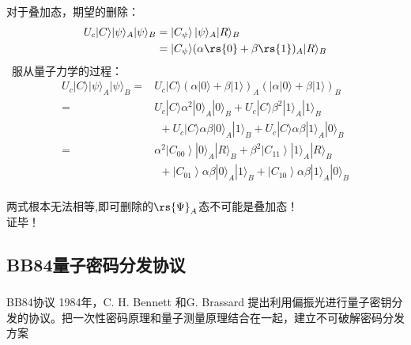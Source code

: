 \begin{frame}
    \frametitle{}
    对于叠加态，期望的删除：
    \[\begin{aligned}
        U_{c}|C\rangle|\psi\rangle_{A}|\psi\rangle_{B}&=\left|C_{\psi}\right\rangle|\psi\rangle_{A}|R\rangle_{B} \\
        &=|C_{\psi}\rangle(\alpha\rs{0}+\beta\rs{1})_{A}|R\rangle_{B} 
        \end{aligned} 
    \]
     服从量子力学的过程：
    \[ \begin{aligned}
        U_{c}|C\rangle|\psi\rangle_{A}|\psi\rangle_{B}=&U_{c}|C\rangle(\alpha|0\rangle+\beta|1\rangle)_{A}(|\alpha| 0\rangle+\beta|1\rangle)_{B} \\
        =& U_{c}|C\rangle \alpha^{2}|0\rangle_{A}|0\rangle_{B}+U_{c}|C\rangle \beta^{2}|1\rangle_{A}|1\rangle_{B} \\
        &~~+U_{c}|C\rangle \alpha \beta|0\rangle_{A}|1\rangle_{B}+U_{c}|C\rangle \alpha \beta|1\rangle_{A}|0\rangle_{B} \\
        =& \alpha^{2}\left|C_{00}\right\rangle|0\rangle_{A}|R\rangle_{B}+\beta^{2}\left|C_{11}\right\rangle|1\rangle_{A}|R\rangle_{B} \\
        &~~+\left|C_{01}\right\rangle \alpha \beta|0\rangle_{A}|1\rangle_{B}+\left|C_{10}\right\rangle \alpha \beta|1\rangle_{A}|0\rangle_{B}
        \end{aligned}
    \]
    ~~\\
    两式根本无法相等,即可删除的$\rs{\Psi}_A$态不可能是叠加态！\\
    证毕！          
\end{frame}

\subsection{BB84量子密码分发协议}
\begin{frame}
    \frametitle{}
    \begin{tcolorbox2}{BB84协议}
    {1984年，C. H. Bennett 和G. Brassard 提出利用偏振光进行量子密钥分发的协议。把一次性密码原理和量子测量原理结合在一起，建立不可破解密码分发方案}
    \end{tcolorbox2}  
\end{frame}

